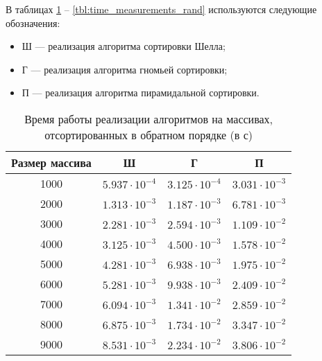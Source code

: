 В таблицах \ref{tbl:time_measurements} -- \ref{tbl:time_measurements_rand} используются следующие обозначения: 
\begin{itemize}
	\item Ш --- реализация алгоритма сортировки Шелла;
	\item Г --- реализация алгоритма гномьей сортировки;
	\item П --- реализация алгоритма пирамидальной сортировки.
\end{itemize}

\begin{table}[h]
	\begin{center}
		\begin{threeparttable}
			\captionsetup{justification=raggedright,singlelinecheck=off}
			\caption{Время работы реализации алгоритмов на массивах, отсортированных в обратном порядке (в с)}
			\label{tbl:time_measurements}
			\begin{tabular}{|c|c|c|c|}
				\hline
				Размер массива &  Ш  & Г & П \\
				\hline
				1000 &$ 5.937\cdot 10^{-4} $&$ 3.125\cdot 10^{-4} $&$ 3.031\cdot 10^{-3}$\\
				\hline
				2000 &$ 1.313\cdot 10^{-3} $&$ 1.187\cdot 10^{-3} $&$ 6.781\cdot 10^{-3}$\\
				\hline
				3000 &$ 2.281\cdot 10^{-3} $&$ 2.594\cdot 10^{-3} $&$ 1.109\cdot 10^{-2}$\\
				\hline
				4000 &$ 3.125\cdot 10^{-3} $&$ 4.500\cdot 10^{-3} $&$ 1.578\cdot 10^{-2}$\\
				\hline
				5000 &$ 4.281\cdot 10^{-3} $&$ 6.938\cdot 10^{-3} $&$ 1.975\cdot 10^{-2}$\\
				\hline
				6000 &$ 5.281\cdot 10^{-3} $&$ 9.938\cdot 10^{-3} $&$ 2.409\cdot 10^{-2}$\\
				\hline
				7000 &$ 6.094\cdot 10^{-3} $&$ 1.341\cdot 10^{-2} $&$ 2.859\cdot 10^{-2}$\\
				\hline
				8000 &$ 6.875\cdot 10^{-3} $&$ 1.734\cdot 10^{-2} $&$ 3.347\cdot 10^{-2}$\\
				\hline
				9000 &$ 8.531\cdot 10^{-3} $&$ 2.234\cdot 10^{-2} $&$ 3.806\cdot 10^{-2}$\\
				\hline
			\end{tabular}
		\end{threeparttable}
	\end{center}
\end{table}

